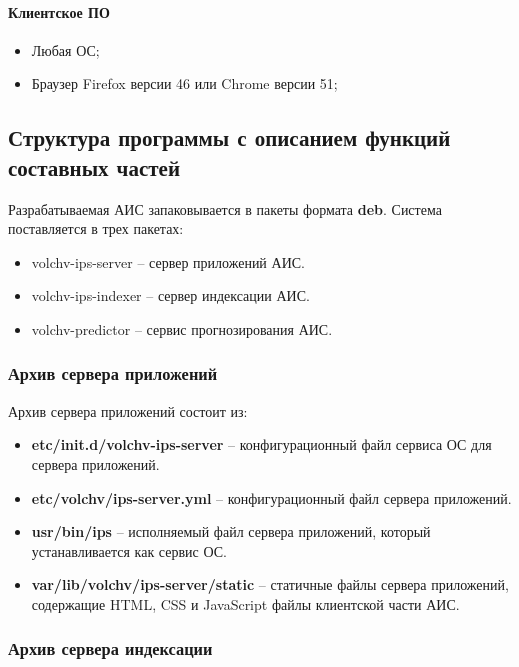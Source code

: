 \paragraph*{Клиентское ПО} \hfill

\begin{itemize}
\item Любая ОС;
\item Браузер Firefox версии 46 или Chrome версии 51;
\end{itemize}

\subsection{Структура программы с описанием функций составных частей}

Разрабатываемая АИС запаковывается в пакеты формата \textbf{deb}. Система поставляется в трех пакетах:
\begin{itemize}
\item volchv-ips-server -- сервер приложений АИС.
\item volchv-ips-indexer -- сервер индексации АИС.
\item volchv-predictor -- сервис прогнозирования АИС.
\end{itemize}

\subsubsection{Архив сервера приложений}  \hfill

Архив сервера приложений состоит из:
\begin{itemize}
\item \textbf{etc/init.d/volchv-ips-server} -- конфигурационный файл сервиса ОС для сервера приложений. 
\item \textbf{etc/volchv/ips-server.yml} -- конфигурационный файл сервера приложений.
\item \textbf{usr/bin/ips} -- исполняемый файл сервера приложений, который устанавливается как сервис ОС. 
\item \textbf{var/lib/volchv/ips-server/static} -- статичные файлы сервера приложений, содержащие HTML, CSS и JavaScript файлы клиентской части АИС.
\end{itemize}

\subsubsection{Архив сервера индексации} \hfill

